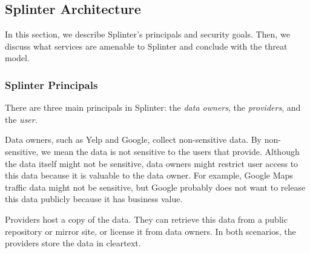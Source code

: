 

\subsection{Splinter Architecture}
\label{sec:goals}

In this section, we describe Splinter's principals and security goals.
Then, we discuss what services are amenable to Splinter and conclude
with the threat model.

\subsubsection{Splinter Principals}
\label{sec:model}
There are three main principals in Splinter: 
the \emph{data owners}, the \emph{providers}, and the \emph{user}.

Data owners, such as Yelp and Google, collect non-sensitive data.
By non-sensitive, we mean the data is not sensitive to the 
users that provide. Although the data itself might not be sensitive,
data owners might restrict user access to this data because
it is valuable to the data owner. 
For example, Google Maps traffic data might not be
sensitive, but Google probably does not want to release this data publicly
because it has business value.

Providers host a copy of the data. They can 
retrieve this data from a public repository or mirror site,
or license it from data owners. In both scenarios,
the providers store the data in cleartext. 

